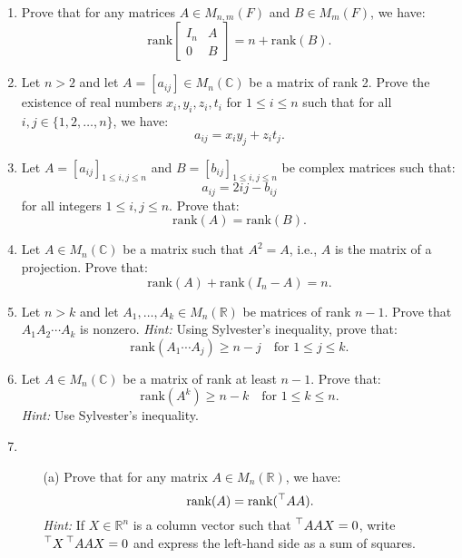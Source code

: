 \documentclass{article}
\theoremstyle{remark}
\begin{document}
\begin{enumerate}
        \item Prove that for any matrices \( A \in M_{n,m}(F) \) and \( B \in M_m(F) \), we have:
        \[
        \text{rank} \begin{bmatrix}
        I_n & A \\
        0 & B
        \end{bmatrix} = n + \text{rank}(B).
        \]
    
        \item Let \( n > 2 \) and let \( A = [a_{ij}] \in M_n(\mathbb{C}) \) be a matrix of rank 2. Prove the existence of real numbers \( x_i, y_i, z_i, t_i \) for \( 1 \leq i \leq n \) such that for all \( i, j \in \{1, 2, \dots, n\} \), we have:
        \[
        a_{ij} = x_i y_j + z_i t_j.
        \]
    
        \item Let \( A = [a_{ij}]_{1 \leq i,j \leq n} \) and \( B = [b_{ij}]_{1 \leq i,j \leq n} \) be complex matrices such that:
        \[
        a_{ij} = 2i j - b_{ij}
        \]
        for all integers \( 1 \leq i, j \leq n \). Prove that:
        \[
        \text{rank}(A) = \text{rank}(B).
        \]

        \item Let \( A \in M_n(\mathbb{C}) \) be a matrix such that \( A^2 = A \), i.e., \( A \) is the matrix of a projection. Prove that:
        \[
        \text{rank}(A) + \text{rank}(I_n - A) = n.
        \]

        \item Let \( n > k \) and let \( A_1, \dots, A_k \in M_n(\mathbb{R}) \) be matrices of rank \( n - 1 \). Prove that \( A_1 A_2 \cdots A_k \) is nonzero.  
        \textit{Hint:} Using Sylvester’s inequality, prove that:
        \[
        \text{rank}(A_1 \cdots A_j) \geq n - j \quad \text{for } 1 \leq j \leq k.
        \]

        \item Let \( A \in M_n(\mathbb{C}) \) be a matrix of rank at least \( n - 1 \). Prove that:
        \[
        \text{rank}(A^k) \geq n - k \quad \text{for } 1 \leq k \leq n.
        \]
        \textit{Hint:} Use Sylvester’s inequality.

        \item \begin{enumerate}
            \item[(a)] Prove that for any matrix \( A \in M_n(\mathbb{R}) \), we have:
            \[
            \text{rank}(A) = \text{rank}(\prescript{\top}{}AA).
            \]
            \textit{Hint:} If \( X \in \mathbb{R}^n \) is a column vector such that \( \prescript{\top}{}A A X = 0 \), write \( \prescript{\top}{}X \prescript{\top}{}A A X = 0 \) and express the left-hand side as a sum of squares.
    

\end{enumerate}
\end{enumerate}
\end{document}

